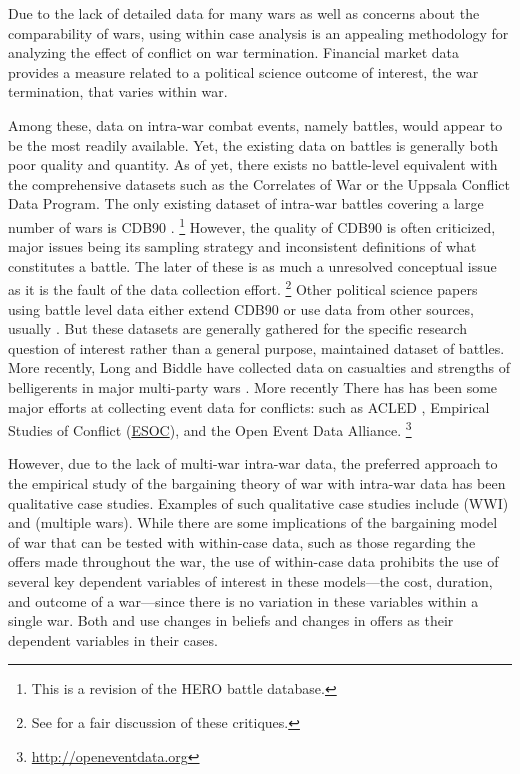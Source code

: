 Due to the lack of detailed data for many wars as well as concerns about the comparability of wars, using within case analysis is an appealing methodology for analyzing the effect of conflict on war termination.
Financial market data provides a measure related to a political science outcome of interest, the war termination, that varies within war.

Among these, data on intra-war combat events, namely battles, would appear to be the most readily available.
Yet, the existing data on battles is generally both poor quality and quantity.
As of yet, there exists no battle-level equivalent with the comprehensive datasets such as the Correlates of War \parencite{SarkeesWayman2010} or the Uppsala Conflict Data Program.
The only existing dataset of intra-war battles covering a large number of wars is CDB90 \parencite{cdb90}.%
\footnote{This is a revision of the HERO battle database.}
However, the quality of CDB90 is often criticized, major issues being its sampling strategy and inconsistent definitions of what constitutes a battle.
The later of these is as much a unresolved conceptual issue as it is the fault of the data collection effort.%
\footnote{See \textcite{BiddleLong2004} for a fair discussion of these critiques.}
Other political science papers using battle level data either extend CDB90 or use data from other sources, usually \textcite{Clodfelter2008}.
But these datasets are generally gathered for the specific research question of interest rather than a general purpose, maintained dataset of battles.
More recently, Long and Biddle have collected data on casualties and strengths of belligerents in major multi-party wars \parencite{CochranLong2014}.
More recently There has has been some major efforts at collecting event data for conflicts:
such as ACLED \parencites{RaleighLinkeHegreEtAl2010}, Empirical Studies of Conflict (\href{http://esoc.princeton.edu/}{ESOC}), and the Open Event Data Alliance.%
\footnote{\url{http://openeventdata.org}}

However, due to the lack of multi-war intra-war data, the preferred approach to the empirical study of the bargaining theory of war with intra-war data has been qualitative case studies\parencites{Reiter2003}[][Chapter 9]{Reiter2009}.
Examples of such qualitative case studies include  \textcite{Goemans2000} (WWI) and \textcite{Reiter2009} (multiple wars).
While there are some implications of the bargaining model of war that can be tested with within-case data, such as those regarding the offers made throughout the war, the use of within-case data prohibits the use of several key dependent variables of interest in these models---the cost, duration, and outcome of a war---since there is no variation in these variables within a single war.
Both \textcite{Reiter2009} and \textcite{Goemans2000} use changes in beliefs and changes in offers as their dependent variables in their cases.

